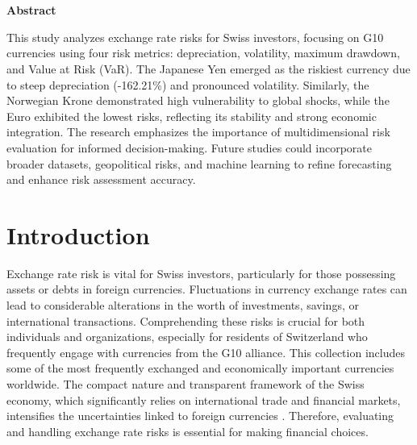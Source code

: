 \documentclass[11pt,a4paper,english,oneside]{book}
\begin{document}
\thispagestyle{empty}
\titleGP\

\newpage

\doublespacing\
\setcounter{page}{1}

{\LARGE \textbf{Abstract}}

This study analyzes exchange rate risks for Swiss investors, focusing on G10 currencies using four risk metrics: depreciation, volatility, maximum drawdown, and Value at Risk (VaR). The Japanese Yen emerged as the riskiest currency due to steep depreciation (-162.21\%) and pronounced volatility. Similarly, the Norwegian Krone demonstrated high vulnerability to global shocks, while the Euro exhibited the lowest risks, reflecting its stability and strong economic integration. The research emphasizes the importance of multidimensional risk evaluation for informed decision-making. Future studies could incorporate broader datasets, geopolitical risks, and machine learning to refine forecasting and enhance risk assessment accuracy.



\tableofcontents
\listoffigures




\chapter{Introduction}

Exchange rate risk is vital for Swiss investors, particularly for those possessing assets or debts in foreign currencies. Fluctuations in currency exchange rates can lead to considerable alterations in the worth of investments, savings, or international transactions. Comprehending these risks is crucial for both individuals and organizations, especially for residents of Switzerland who frequently engage with currencies from the G10 alliance. This collection includes some of the most frequently exchanged and economically important currencies worldwide. The compact nature and transparent framework of the Swiss economy, which significantly relies on international trade and financial markets, intensifies the uncertainties linked to foreign currencies \parencite{frohm2024strengthening}. Therefore, evaluating and handling exchange rate risks is essential for making financial choices.
\end{document}
